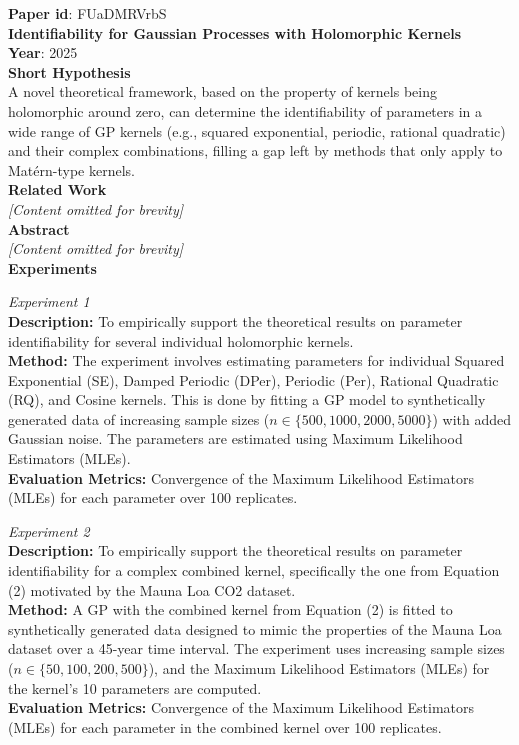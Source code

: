 \begin{tcolorbox}[title=\textbf{Example: High-Soundness Proposal}]
\small
\raggedright

\textbf{Paper id}: FUaDMRVrbS \\

\textbf{Identifiability for Gaussian Processes with Holomorphic Kernels} \\

\textbf{Year}: 2025 \\

\textbf{Short Hypothesis} \\
A novel theoretical framework, based on the property of kernels being holomorphic around zero, can determine the identifiability of parameters in a wide range of GP kernels (e.g., squared exponential, periodic, rational quadratic) and their complex combinations, filling a gap left by methods that only apply to Matérn-type kernels. \\

\textbf{Related Work} \\
\textit{[Content omitted for brevity]} \\

\textbf{Abstract} \\
\textit{[Content omitted for brevity]} \\

\textbf{Experiments}

\textit{Experiment 1} \\
\textbf{Description:} To empirically support the theoretical results on parameter identifiability for several individual holomorphic kernels. \\
\textbf{Method:} The experiment involves estimating parameters for individual Squared Exponential (SE), Damped Periodic (DPer), Periodic (Per), Rational Quadratic (RQ), and Cosine kernels. This is done by fitting a GP model to synthetically generated data of increasing sample sizes ($n \in \{500, 1000, 2000, 5000\}$) with added Gaussian noise. The parameters are estimated using Maximum Likelihood Estimators (MLEs). \\
\textbf{Evaluation Metrics:} Convergence of the Maximum Likelihood Estimators (MLEs) for each parameter over 100 replicates.

\vspace{0.5em}
\textit{Experiment 2} \\
\textbf{Description:} To empirically support the theoretical results on parameter identifiability for a complex combined kernel, specifically the one from Equation (2) motivated by the Mauna Loa CO2 dataset. \\
\textbf{Method:} A GP with the combined kernel from Equation (2) is fitted to synthetically generated data designed to mimic the properties of the Mauna Loa dataset over a 45-year time interval. The experiment uses increasing sample sizes ($n \in \{50, 100, 200, 500\}$), and the Maximum Likelihood Estimators (MLEs) for the kernel's 10 parameters are computed. \\
\textbf{Evaluation Metrics:} Convergence of the Maximum Likelihood Estimators (MLEs) for each parameter in the combined kernel over 100 replicates. \\



\end{tcolorbox}
